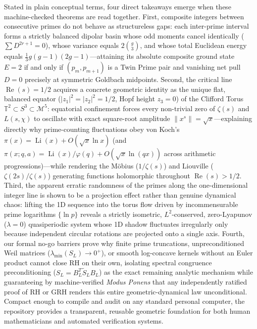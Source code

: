 \documentclass[
  11pt,
]{article}
\begin{document}
Stated in plain conceptual terms, four direct takeaways emerge when
these machine-checked theorems are read together. First, composite
integers between consecutive primes do not behave as structureless gaps:
each inter-prime interval forms a strictly balanced dipolar basin whose
odd moments cancel identically (\(\sum D^{2r+1} = 0\)), whose variance
equals \(2\binom{g}{3}\), and whose total Euclidean energy equals
\(\frac{1}{3}g(g-1)(2g-1)\)---attaining its absolute composite ground
state \(E = 2\) if and only if \((p_m, p_{m+1})\) is a Twin Prime pair
and vanishing net pull \(D = 0\) precisely at symmetric Goldbach
midpoints. Second, the critical line \(\operatorname{Re}(s) = 1/2\)
acquires a concrete geometric identity as the unique flat, balanced
equator (\(|z_1|^2 = |z_2|^2 = 1/2\), Hopf height \(z_3 = 0\)) of the
Clifford Torus \(\mathbb{T}^2 \subset S^3 \subset \mathcal{M}^5\):
equatorial confinement forces every non-trivial zero of \(\zeta(s)\) and
\(L(s, \chi)\) to oscillate with exact square-root amplitude
\(\|x^s\| = \sqrt{x}\)---explaining directly why prime-counting
fluctuations obey von Koch's
\(\pi(x) = \operatorname{Li}(x) + O(\sqrt{x}\ln x)\) (and
\(\pi(x;q,a) = \operatorname{Li}(x)/\varphi(q) + O(\sqrt{x}\ln(qx))\)
across arithmetic progressions)---while rendering the Möbius
(\(1/\zeta(s)\)) and Liouville (\(\zeta(2s)/\zeta(s)\)) generating
functions holomorphic throughout \(\operatorname{Re}(s) > 1/2\). Third,
the apparent erratic randomness of the primes along the one-dimensional
integer line is shown to be a projection effect rather than genuine
dynamical chaos: lifting the 1D sequence into the torus flow driven by
incommensurable prime logarithms \(\{\ln p\}\) reveals a strictly
isometric, \(L^2\)-conserved, zero-Lyapunov (\(\lambda = 0\))
quasiperiodic system whose 1D shadow fluctuates irregularly only because
independent circular rotations are projected onto a single axis. Fourth,
our formal no-go barriers prove why finite prime truncations,
unpreconditioned Weil matrices (\(\lambda_{\min}(S_L) \to 0^+\)), or
smooth log-concave kernels without an Euler product cannot close RH on
their own, isolating spectral congruence preconditioning
(\(S_L = B_L^T \widetilde{S}_L B_L\)) as the exact remaining analytic
mechanism while guaranteeing by machine-verified \emph{Modus Ponens}
that any independently ratified proof of RH or GRH renders this entire
geometric-dynamical law unconditional. Compact enough to compile and
audit on any standard personal computer, the repository provides a
transparent, reusable geometric foundation for both human mathematicians
and automated verification systems.
\end{document}
